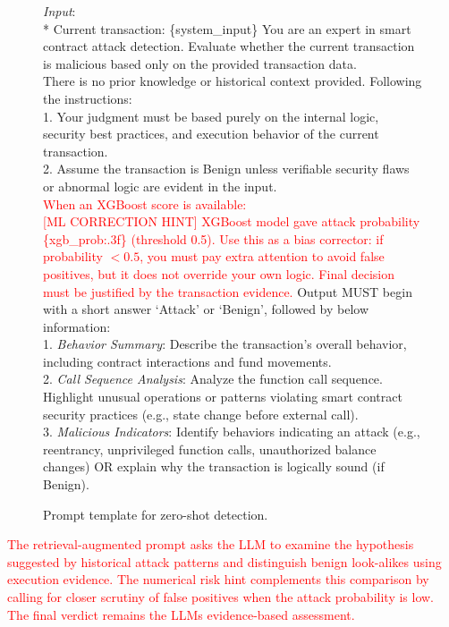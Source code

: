 \begin{figure}[t]
	\begin{tcolorbox}[title=Prompt template for zero-shot detection]
		\emph{Input}:\\
		* Current transaction:  \{system\_input\}
		\tcbline
		You are an expert in smart contract attack detection. Evaluate whether the current transaction is malicious based only on the provided transaction data.\\
		There is no prior knowledge or historical context provided. Following the instructions: \\
		1. Your judgment must be based purely on the internal logic, security best practices, and execution behavior of the current transaction. \\
		2. Assume the transaction is Benign unless verifiable security flaws or abnormal logic are evident in the input.\\
		\tcbline
		\textcolor{red}{When an XGBoost score is available:}\\
		\textcolor{red}{[ML CORRECTION HINT] XGBoost model gave attack probability \{xgb\_prob:.3f\} (threshold 0.5). Use this as a bias corrector: if probability $<0.5$, you must pay extra attention to avoid false positives, but it does not override your own logic. Final decision must be justified by the transaction evidence.}
		\tcbline
		Output MUST begin with a short answer `Attack' or `Benign', followed by below information: \\ 
		1. \emph{Behavior Summary}:  Describe the transaction's overall behavior, including contract interactions and fund movements.
		\\
		2. \emph{Call Sequence Analysis}:  Analyze the function call sequence. Highlight unusual operations or patterns violating smart contract security practices (e.g., state change before external call).\\
		3. \emph{Malicious Indicators}: Identify behaviors indicating an attack (e.g., reentrancy, unprivileged function calls, unauthorized balance changes) OR explain why the transaction is logically sound (if Benign).
	\end{tcolorbox}
	
	\caption{Prompt template for zero-shot detection.}
	\label{fig:prompt2}
\end{figure}
\textcolor{red}{The retrieval-augmented prompt asks the LLM to examine the hypothesis suggested by historical attack patterns and distinguish benign look-alikes using execution evidence. The numerical risk hint complements this comparison by calling for closer scrutiny of false positives when the attack probability is low. The final verdict remains the LLM\textquotesingle s evidence-based assessment.}

